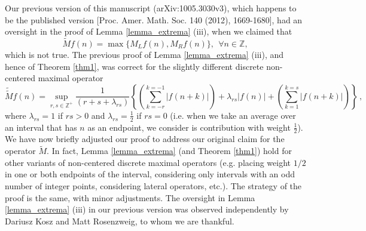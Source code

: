 \documentclass[reqno]{amsart}
\theoremstyle{definition}
\theoremstyle{remark}
\numberwithin{equation}{section}
\newcommand{\Z}{\mathbb{Z}}
\newcommand{\wM}{\widetilde{M}}
\begin{document}
Our previous version of this manuscript (arXiv:1005.3030v3), which happens to be the published version [Proc. Amer. Math. Soc. 140 (2012), 1669-1680], had an oversight in the proof of Lemma \ref{lemma_extrema} (iii), when we claimed that 
\begin{equation}\label{eq_lateral}
\wM  f(n) = \max\{M_Lf(n), M_Rf(n)\}, \ \ \forall n \in \Z,
\end{equation}
which is not true. The previous proof of Lemma \ref{lemma_extrema} (iii), and hence of Theorem \ref{thm1}, was correct for the slightly different discrete non-centered maximal operator
\begin{equation*}
 \widetilde{\wM}  f(n) = \sup_{r,s \in \Z^{+}} \frac{1}{(r +s+ \lambda_{rs})}\left\{ \left( \sum_{k=-r}^{k=-1} |f(n+k)|\right) + \lambda_{rs} |f(n)| + \left(\sum_{k=1}^{k=s} |f(n+k)|\right)\right\}\,,
\end{equation*}
where $\lambda_{rs} = 1$ if $rs>0$ and $\lambda_{rs} = \frac12$ if $rs=0$ (i.e. when we take an average over an interval that has $n$ as an endpoint, we consider is contribution with weight $\frac12$). We have now briefly adjusted our proof to address our original claim for the operator $\wM$. In fact, Lemma \ref{lemma_extrema} (and Theorem \ref{thm1}) hold for other variants of non-centered discrete maximal operators (e.g. placing weight $1/2$ in one or both endpoints of the interval, considering only intervals with an odd number of integer points, considering lateral operators, etc.). The strategy of the proof is the same, with minor adjustments. The oversight in Lemma  \ref{lemma_extrema} (iii) in our previous version was observed independently by Dariusz Kosz and Matt Rosenzweig, to whom we are thankful.
\end{document}

